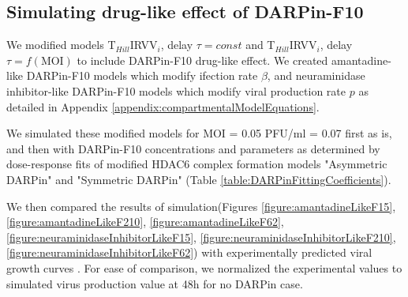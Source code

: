 \subsection{Simulating drug-like effect of DARPin-F10}

We modified models T$_{Hill}$IRVV$_i$, delay $\tau = const$ and T$_{Hill}$IRVV$_i$, delay $\tau = f(\text{MOI})$ to include DARPin-F10 drug-like effect. We created amantadine-like DARPin-F10 models which modify ifection rate $\beta$, and neuraminidase inhibitor-like DARPin-F10 models which modify viral production rate $p$ as detailed in Appendix \ref{appendix:compartmentalModelEquations}.

We simulated these modified models for MOI = 0.05 PFU/ml = 0.07 first as is, and then with DARPin-F10 concentrations and parameters as determined by dose-response fits of modified HDAC6 complex formation models "Asymmetric DARPin" and "Symmetric DARPin" (Table \ref{table:DARPinFittingCoefficients}).

We then compared the results of simulation(Figures \ref{figure:amantadineLikeF15}, \ref{figure:amantadineLikeF210}, \ref{figure:amantadineLikeF62}, \ref{figure:neuraminidaseInhibitorLikeF15}, \ref{figure:neuraminidaseInhibitorLikeF210}, \ref{figure:neuraminidaseInhibitorLikeF62}) with experimentally predicted viral growth curves \cite{DarpinData}. For ease of comparison, we normalized the experimental values to simulated virus production value at 48h for no DARPin case.

